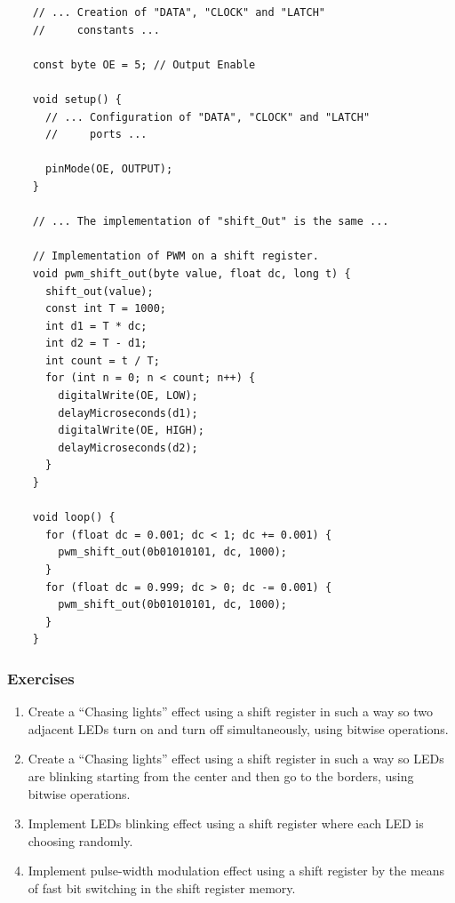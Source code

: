 \documentclass[../sparc.tex]{subfiles}
\begin{document}
\begin{listing}[H]
  \begin{verbatim}
    // ... Creation of "DATA", "CLOCK" and "LATCH"
    //     constants ...

    const byte OE = 5; // Output Enable

    void setup() {
      // ... Configuration of "DATA", "CLOCK" and "LATCH"
      //     ports ...

      pinMode(OE, OUTPUT);
    }

    // ... The implementation of "shift_Out" is the same ...

    // Implementation of PWM on a shift register.
    void pwm_shift_out(byte value, float dc, long t) {
      shift_out(value);
      const int T = 1000;
      int d1 = T * dc;
      int d2 = T - d1;
      int count = t / T;
      for (int n = 0; n < count; n++) {
        digitalWrite(OE, LOW);
        delayMicroseconds(d1);
        digitalWrite(OE, HIGH);
        delayMicroseconds(d2);
      }
    }

    void loop() {
      for (float dc = 0.001; dc < 1; dc += 0.001) {
        pwm_shift_out(0b01010101, dc, 1000);
      }
      for (float dc = 0.999; dc > 0; dc -= 0.001) {
        pwm_shift_out(0b01010101, dc, 1000);
      }
    }
  \end{verbatim}
  \label{listing:communication-sipo-pwm}
  \caption{Implementation of pulse-width modulation using a shift register.}
\end{listing}

\subsubsection{Exercises}

\begin{enumerate}
\item Create a ``Chasing lights'' effect using a shift register in such a way so
  two adjacent LEDs turn on and turn off simultaneously, using bitwise
  operations.
\item Create a ``Chasing lights'' effect using a shift register in such a way so
  LEDs are blinking starting from the center and then go to the borders, using
  bitwise operations.
\item Implement LEDs blinking effect using a shift register where each LED is
  choosing randomly.
\item Implement pulse-width modulation effect using a shift register by the
  means of fast bit switching in the shift register memory.
\end{enumerate}
\end{document}
